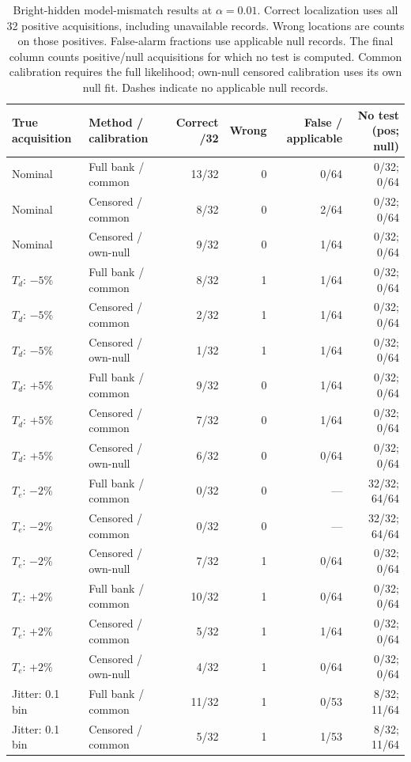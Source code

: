 \begin{table}[t]\centering
\caption{Bright-hidden model-mismatch results at $\alpha=0.01$. Correct localization uses all 32 positive acquisitions, including unavailable records. Wrong locations are counts on those positives. False-alarm fractions use applicable null records. The final column counts positive/null acquisitions for which no test is computed. Common calibration requires the full likelihood; own-null censored calibration uses its own null fit. Dashes indicate no applicable null records.}
\label{tab:robust}
\begin{tabular}{llrrrr}\toprule
True acquisition & Method / calibration & Correct /32 & Wrong & False / applicable & No test (pos; null)\\\midrule
Nominal & Full bank / common & 13/32 & 0 & 0/64 & 0/32; 0/64\\
Nominal & Censored / common & 8/32 & 0 & 2/64 & 0/32; 0/64\\
Nominal & Censored / own-null & 9/32 & 0 & 1/64 & 0/32; 0/64\\
$T_d$: $-5\%$ & Full bank / common & 8/32 & 1 & 1/64 & 0/32; 0/64\\
$T_d$: $-5\%$ & Censored / common & 2/32 & 1 & 1/64 & 0/32; 0/64\\
$T_d$: $-5\%$ & Censored / own-null & 1/32 & 1 & 1/64 & 0/32; 0/64\\
$T_d$: $+5\%$ & Full bank / common & 9/32 & 0 & 1/64 & 0/32; 0/64\\
$T_d$: $+5\%$ & Censored / common & 7/32 & 0 & 1/64 & 0/32; 0/64\\
$T_d$: $+5\%$ & Censored / own-null & 6/32 & 0 & 0/64 & 0/32; 0/64\\
$T_e$: $-2\%$ & Full bank / common & 0/32 & 0 & --- & 32/32; 64/64\\
$T_e$: $-2\%$ & Censored / common & 0/32 & 0 & --- & 32/32; 64/64\\
$T_e$: $-2\%$ & Censored / own-null & 7/32 & 1 & 0/64 & 0/32; 0/64\\
$T_e$: $+2\%$ & Full bank / common & 10/32 & 1 & 0/64 & 0/32; 0/64\\
$T_e$: $+2\%$ & Censored / common & 5/32 & 1 & 1/64 & 0/32; 0/64\\
$T_e$: $+2\%$ & Censored / own-null & 4/32 & 1 & 0/64 & 0/32; 0/64\\
Jitter: 0.1 bin & Full bank / common & 11/32 & 1 & 0/53 & 8/32; 11/64\\
Jitter: 0.1 bin & Censored / common & 5/32 & 1 & 1/53 & 8/32; 11/64\\

\end{tabular}
\end{table}
